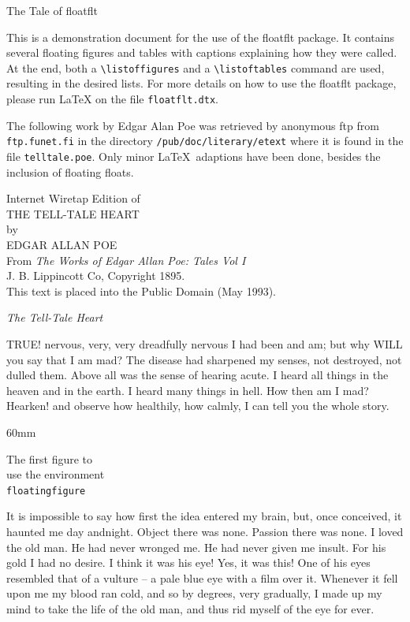 \documentclass[11pt]{article}
\begin{document}
\centerline{\Huge The Tale of
\textsf{floatflt}}\bigskip

\noindent This is a demonstration document for the use
of the \textsf{floatflt} package.  It contains several
floating figures and tables with captions explaining how
they were called.  At the end, both a
\verb+\listoffigures+ and a \verb+\listoftables+ command
are used, resulting in the desired lists.  For more
details on how to use the \textsf{floatflt} package,
please run \LaTeX{} on the file \texttt{floatflt.dtx}.

The following work by Edgar Alan Poe was retrieved by
anonymous ftp from \texttt{ftp.funet.fi} in the
directory \texttt{/pub/doc/literary/etext} where it is
found in the file \texttt{telltale.poe}.  Only minor
\LaTeX\ adaptions have been done, besides the inclusion
of floating floats.

\begin{center}
Internet Wiretap Edition of\\[2mm]
{\large THE TELL-TALE HEART}\\
by\\ {\large EDGAR ALLAN POE}\\[2mm]
From \textit{The Works of Edgar Allan Poe: Tales Vol I}\\
J. B. Lippincott Co, Copyright 1895.\\[2mm]
This text is placed into the Public Domain (May 1993).\\
\end{center}

\noindent\textit{\Large The Tell-Tale Heart}

\noindent TRUE! nervous, very, very dreadfully nervous
I had been and am; but why WILL you say
that I am mad? The disease had sharpened
my senses, not destroyed, not dulled them. Above
all was the sense of hearing acute. I heard all things
in the heaven and in the earth. I heard many things
in hell. How then am I mad? Hearken! and observe how healthily, how
calmly, I can tell you the
whole story.

\begin{floatingfigure}{60mm}
\caption{The \texttt{floatingfigure} environment with \texttt{60mm}
for \textit{width} and no \textit{option}.}
\centering %
The first figure to\\ use the environment\\ \texttt{floatingfigure}
\end{floatingfigure}
It is impossible to say how first the idea entered
my brain, but, once conceived, it haunted me day
and\linebreak night. Object there was none. Passion there
was none. I loved the old man. He had never
wronged me. He had never given me insult. For
his gold I had no desire. I think it was his eye!
Yes, it was this! One of his eyes resembled that
of a vulture -- a pale blue eye with a film over it.
Whenever it fell upon me my blood ran cold, and
so by degrees, very gradually, I made up my mind
to take the life of the old man, and thus rid myself
of the eye for ever.
\end{document}
